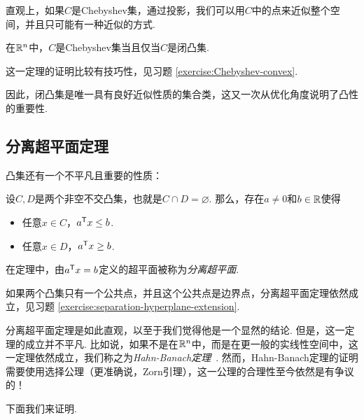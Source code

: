 直观上，如果$C$是Chebyshev集，通过投影，我们可以用$C$中的点来近似整个空间，并且只可能有一种近似的方式. 

\begin{theorem}\label{thm:Chebyshev-convex}
    在$\mathbb{R}^n$中，$C$是Chebyshev集当且仅当$C$是闭凸集.
\end{theorem}
这一定理的证明比较有技巧性，见习题 \ref{exercise:Chebyshev-convex}.

因此，闭凸集是唯一具有良好近似性质的集合类，这又一次从优化角度说明了凸性的重要性.

\subsection{分离超平面定理}

凸集还有一个不平凡且重要的性质：
\begin{theorem}[分离超平面定理]\label{thm:separation-hyperplane}
设$C,D$是两个非空不交凸集，也就是$C\cap D=\varnothing$. 那么，存在$a\neq 0$和$b\in\mathbb{R}$使得
\begin{itemize}
    \item 任意$x\in C$，$a^{\mathsf{T}} x\leq b$.
    \item 任意$x\in D$，$a^{\mathsf{T}} x\geq b$.
\end{itemize}
\end{theorem}

在定理中，由$a^{\mathsf{T}} x=b$定义的超平面被称为\textit{分离超平面}.

如果两个凸集只有一个公共点，并且这个公共点是边界点，分离超平面定理依然成立，见习题 \ref{exercise:separation-hyperplane-extension}.

\begin{remark}
    分离超平面定理是如此直观，以至于我们觉得他是一个显然的结论. 但是，这一定理的成立并不平凡. 比如说，如果不是在$\mathbb{R}^n$中，而是在更一般的实线性空间中，这一定理依然成立，我们称之为\textit{Hahn-Banach定理}~\cite{taoHahnBanachTheoremMengers2007}. 然而，Hahn-Banach定理的证明需要使用选择公理（更准确说，Zorn引理），这一公理的合理性至今依然是有争议的！
\end{remark}

下面我们来证明.

